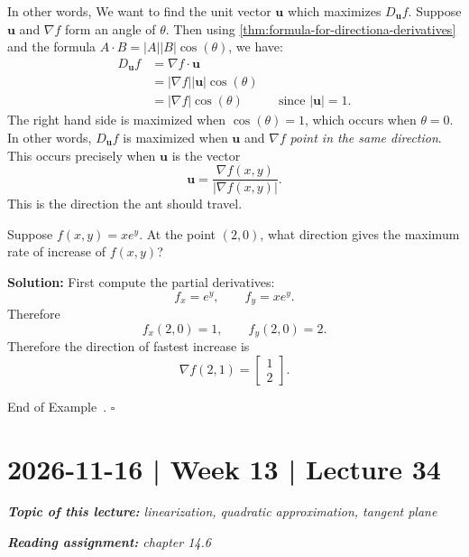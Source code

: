 \documentclass[10pt]{article}
\theoremstyle{definition}
\newtheorem{example}[theorem]{Example}
\renewenvironment{example}
{\begin{oldexample}}
  {\par\smallskip\hfill   End of Example~\theexample. $\square$    \par\end{oldexample}}
\newcommand{\vt}{\vskip 5mm} %
\newcommand{\Fl}{\vt\noindent\textbf} %
\newcommand{\1}[1]{\textbf{1}_{\left[#1\right]}} %
\begin{document}
In other words, We want to find the unit vector $\boldsymbol{u}$ which maximizes $D_{\boldsymbol{u}}f$.
Suppose $\boldsymbol{u}$ and $\nabla f$ form an angle of $\theta$. Then using
\cref{thm:formula-for-directiona-derivatives} and the formula $A\cdot B =
|A||B|\cos(\theta)$, we have:
\begin{align*}
  D_{\boldsymbol{u}} f 
  &= \nabla f\cdot \boldsymbol{u} \\
  &=  |\nabla f| |\boldsymbol{u}| \cos(\theta)\\
  &=  |\nabla f| \cos(\theta) &&\text{since $|\boldsymbol{u}| =1$.}
\end{align*}
The right hand side is maximized when $\cos(\theta)=1$, which occurs when
$\theta=0$. In other words, $D_{\boldsymbol{u}}f$ is maximized when
$\boldsymbol{u}$ and $\nabla f$ \textit{point in the same direction}. This
occurs precisely when $\boldsymbol{u}$ is the vector
\begin{equation*}
  \boldsymbol{u} = \frac{\nabla f(x,y)}{|\nabla f(x,y)|}.
\end{equation*}
This is the direction the ant should travel.


\begin{example}
  Suppose $f(x,y) = xe^{y}$. At the point $(2,0)$, what direction gives the
  maximum rate of increase of $f(x,y)$?

  \Fl{Solution:} First compute the partial derivatives:
  \begin{equation*}
    f_{x} = e^{y}, \qquad f_{y} = xe^{y}.
  \end{equation*}
  Therefore
  \begin{equation*}
    f_{x}(2,0) = 1, \qquad f_{y}(2,0) = 2.
  \end{equation*}
  Therefore the direction of fastest increase is
  \begin{equation*}
    \nabla f(2,1) =
    \begin{bmatrix}
      1\\2
    \end{bmatrix}.
  \end{equation*}
\end{example}



\newpage
\section{2026-11-16 | Week 13 | Lecture 34}
\begin{center}
  \begin{tcolorbox}[width=0.9\textwidth, colback=white, colframe=black]
    \textit{\textbf{Topic of this lecture:} linearization, quadratic
      approximation, tangent plane}

    \textit{\textbf{Reading assignment:} chapter 14.6}
  \end{tcolorbox}
\end{center}
\end{document}
